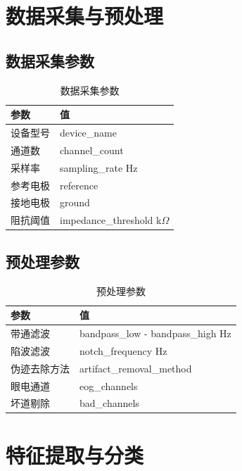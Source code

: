 \documentclass[12pt,a4paper]{article}
\begin{document}
\section{数据采集与预处理}

\subsection{数据采集参数}
\begin{table}[H]
    \centering
    \begin{tabular}{ll}
        \toprule
        参数 & 值 \\
        \midrule
        设备型号 & {{ device_name }} \\
        通道数 & {{ channel_count }} \\
        采样率 & {{ sampling_rate }} Hz \\
        参考电极 & {{ reference }} \\
        接地电极 & {{ ground }} \\
        阻抗阈值 & {{ impedance_threshold }} k$\Omega$ \\
        \bottomrule
    \end{tabular}
    \caption{数据采集参数}
\end{table}

\subsection{预处理参数}
\begin{table}[H]
    \centering
    \begin{tabular}{ll}
        \toprule
        参数 & 值 \\
        \midrule
        带通滤波 & {{ bandpass_low }}-{{ bandpass_high }} Hz \\
        陷波滤波 & {{ notch_frequency }} Hz \\
        伪迹去除方法 & {{ artifact_removal_method }} \\
        眼电通道 & {{ eog_channels }} \\
        坏道剔除 & {{ bad_channels }} \\
        \bottomrule
    \end{tabular}
    \caption{预处理参数}
\end{table}

\section{特征提取与分类}
\end{document}
